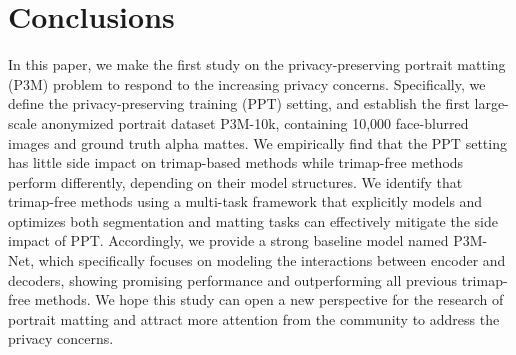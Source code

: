 \documentclass[sigconf]{acmart}
\begin{document}
\begin{table}[htb]
\begin{center}
\end{center}
\caption{Ablation study of P3M-Net.}
\label{tab:ablation}
\end{table}





\section{Conclusions}
In this paper, we make the first study on the privacy-preserving portrait matting (P3M) problem to respond to the increasing privacy concerns. Specifically, we define the privacy-preserving training (PPT) setting, and establish the first large-scale anonymized portrait dataset P3M-10k, containing 10,000 face-blurred images and ground truth alpha mattes. We empirically find that the PPT setting has little side impact on trimap-based methods while trimap-free methods perform differently, depending on their model structures. We identify that trimap-free methods using a multi-task framework that explicitly models and optimizes both segmentation and matting tasks can effectively mitigate the side impact of PPT. Accordingly, we provide a strong baseline model named P3M-Net, which specifically focuses on modeling the interactions between encoder and decoders, showing promising performance and outperforming all previous trimap-free methods. We hope this study can open a new perspective for the research of portrait matting and attract more attention from the community to address the privacy concerns. 



\end{document}
